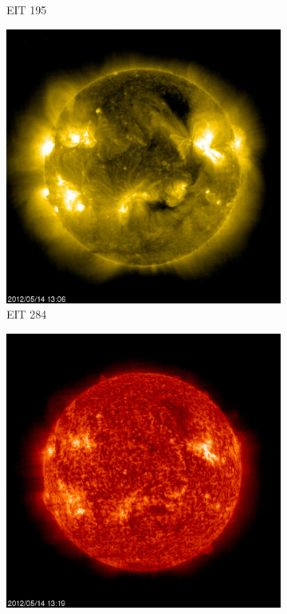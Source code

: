 \documentclass{article}
\begin{document}
\begin{figure}[h!tb]
\begin{subfigure}[b]{0.16\linewidth}
		\caption{EIT 195}
		\label{fig:SOHOEIT195}
	\end{subfigure}
	\begin{subfigure}[b]{0.16\linewidth}
		\includegraphics[width=\textwidth]{Figures/SOHOEIT284.jpg}
		\caption{EIT 284}
		\label{fig:SOHOEIT284}
	\end{subfigure}
	\begin{subfigure}[b]{0.16\linewidth}
		\includegraphics[width=\textwidth]{Figures/SOHOEIT304.jpg}

\end{subfigure}
\end{figure}
\end{document}
